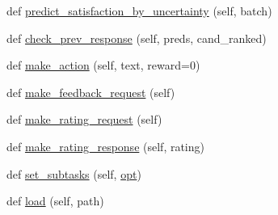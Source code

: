 \begin{DoxyCompactItemize}
\item 
def \hyperlink{classprojects_1_1self__feeding_1_1self__feeding__agent_1_1SelfFeedingAgent_a2788bb764560c9d021ac0b8a5596e1e0}{predict\+\_\+satisfaction\+\_\+by\+\_\+uncertainty} (self, batch)
\item 
def \hyperlink{classprojects_1_1self__feeding_1_1self__feeding__agent_1_1SelfFeedingAgent_af23daff9436acdeadd63b74396870255}{check\+\_\+prev\+\_\+response} (self, preds, cand\+\_\+ranked)
\item 
def \hyperlink{classprojects_1_1self__feeding_1_1self__feeding__agent_1_1SelfFeedingAgent_a57bd8a3eaeecc56d5df86c8bedc6d2d2}{make\+\_\+action} (self, text, reward=0)
\item 
def \hyperlink{classprojects_1_1self__feeding_1_1self__feeding__agent_1_1SelfFeedingAgent_a65e172c7c2dff330e0a92ce361acdc45}{make\+\_\+feedback\+\_\+request} (self)
\item 
def \hyperlink{classprojects_1_1self__feeding_1_1self__feeding__agent_1_1SelfFeedingAgent_aa97b64df930c600bd7be1b69779849e7}{make\+\_\+rating\+\_\+request} (self)
\item 
def \hyperlink{classprojects_1_1self__feeding_1_1self__feeding__agent_1_1SelfFeedingAgent_a0c79b5c366eded0b21f90674837d6d93}{make\+\_\+rating\+\_\+response} (self, rating)
\item 
def \hyperlink{classprojects_1_1self__feeding_1_1self__feeding__agent_1_1SelfFeedingAgent_ad0e1cbdcc32b0c50e15de866efd963f3}{set\+\_\+subtasks} (self, \hyperlink{classparlai_1_1core_1_1torch__agent_1_1TorchAgent_a785bb920cf8c8afc3e9bf6a8b77e335a}{opt})
\item 
def \hyperlink{classprojects_1_1self__feeding_1_1self__feeding__agent_1_1SelfFeedingAgent_aa6011af735a855f23a7630f464abbd9a}{load} (self, path)
\end{DoxyCompactItemize}
